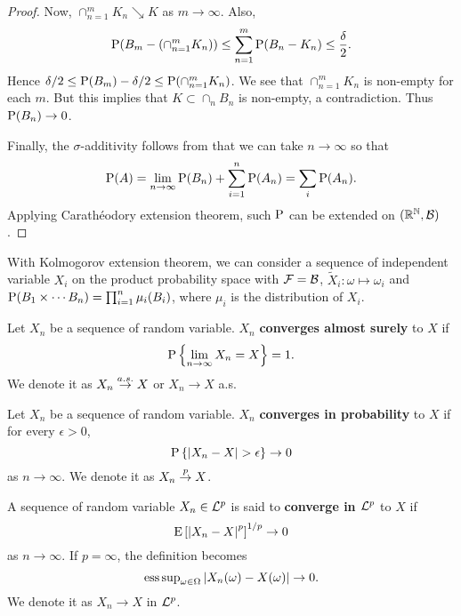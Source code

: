 \begin{proof}
    Now, $\cap_{n=1}^m K_n\searrow K$ as $m\to\infty$. Also, 
    \begin{equation*}
        \P(B_m - (\cap_{n=1}^m K_n)) \leq \sum_{n=1}^m \P(B_n - K_n) \leq \frac{\delta}{2}. 
    \end{equation*} 
    Hence $\delta/2 \leq \P(B_m) - \delta/2 \leq \P(\cap_{n=1}^m K_n)$. 
    We see that $\cap_{n=1}^m K_n$ is non-empty for each $m$. 
    But this implies that $K\subset \cap_n B_n$ is non-empty, 
    a contradiction. Thus $\P(B_n)\to 0$. 

    Finally, the $\sigma$-additivity follows from that we can 
    take $n\to\infty$ so that 
    \begin{equation*}
        \P(A) = \lim_{n\to\infty} \P(B_n) + \sum_{i=1}^n\P(A_n) 
        = \sum_i \P(A_n). 
    \end{equation*}
    Applying Carath\'eodory extension theorem, such $\P$ can be 
    extended on $(\R^\N, \B)$. 
\end{proof}
\begin{remark}
    With Kolmogorov extension theorem, we can consider a sequence 
    of independent variable $X_i$ on the product probability space with 
    $\F = \B$, $\tilde{X}_i:\omega\mapsto\omega_i$ and 
    $\P(B_1\times\cdots B_n) = \prod_{i=1}^n\mu_i(B_i)$, where 
    $\mu_i$ is the distribution of $X_i$. 
\end{remark}

\begin{definition}
    Let $X_n$ be a sequence of random variable. $X_n$ \textbf{converges 
    almost surely} to $X$ if 
    \begin{equation*}
        \P\set{\lim_{n\to\infty}X_n = X} = 1. 
    \end{equation*} 
    We denote it as $X_n\asto X$ or $X_n\to X$ a.s.
\end{definition}

\begin{definition}
    Let $X_n$ be a sequence of random variable. $X_n$ \textbf{converges 
    in probability} to $X$ if for every $\epsilon > 0$, 
    \begin{equation*}
        \P\set{\abs{X_n - X}>\epsilon} \to 0 
    \end{equation*} 
    as $n\to\infty$. We denote it as $X_n\pto X$. 
\end{definition}

\begin{definition}
    A sequence of random variable $X_n\in\L^p$ is 
    said to \textbf{converge in $\L^p$} to $X$ if 
    \begin{equation*}
        \E\sbrc{\abs{X_n - X}^p}^{1/p} \to 0
    \end{equation*}
    as $n\to\infty$. If $p=\infty$, the definition 
    becomes 
    \begin{equation*}
        \esssup_{\omega\in\Omega} \abs{X_n(\omega) - X(\omega)} \to 0.
    \end{equation*}
    We denote it as $X_n\to X$ in $\L^p$. 
\end{definition}

